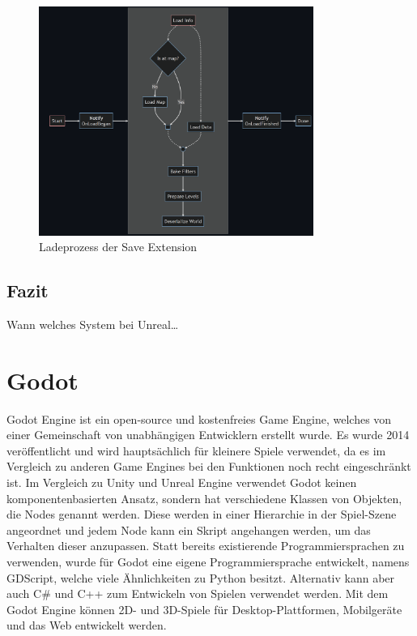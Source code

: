 \begin{figure}[htp]
    \centering
    \includegraphics[width=0.8\textwidth]{images/piperift_load_process.png}
    \caption{Ladeprozess der Save Extension\cite{piperiftLoadProcess}}
    \label{fig:piperiftLoadProcess}
\end{figure}

\subsection{Fazit}
Wann welches System bei Unreal\dots


\section{Godot}
Godot Engine ist ein open-source und kostenfreies Game Engine, welches von einer Gemeinschaft von unabhängigen Entwicklern erstellt wurde. Es wurde 2014 veröffentlicht und wird hauptsächlich für kleinere Spiele verwendet, da es im Vergleich zu anderen Game Engines bei den Funktionen noch recht eingeschränkt ist. Im Vergleich zu Unity und Unreal Engine verwendet Godot keinen komponentenbasierten Ansatz, sondern hat verschiedene Klassen von Objekten, die Nodes genannt werden. Diese werden in einer Hierarchie in der Spiel-Szene angeordnet und jedem Node kann ein Skript angehangen werden, um das Verhalten dieser anzupassen. Statt bereits existierende Programmiersprachen zu verwenden, wurde für Godot eine eigene Programmiersprache entwickelt, namens GDScript, welche viele Ähnlichkeiten zu Python besitzt. Alternativ kann aber auch C\# und C++ zum Entwickeln von Spielen verwendet werden. Mit dem Godot Engine können 2D- und 3D-Spiele für Desktop-Plattformen, Mobilgeräte und das Web entwickelt werden.\cite{salmela2022game}


